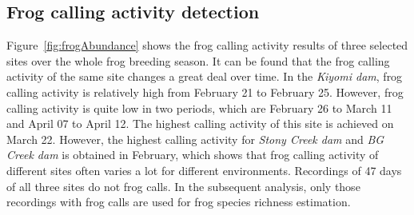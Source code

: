 \subsection{Frog calling activity detection}
Figure~\ref{fig:frogAbundance} shows the frog calling activity results of three selected sites over the whole frog breeding season. It can be found that the frog calling activity of the same site changes a great deal over time. In the \textit{Kiyomi dam}, frog calling activity is relatively high from February 21 to February 25. However, frog calling activity is quite low in two periods, which are February 26 to March 11 and April 07 to April 12. The highest calling activity of this site is achieved on March 22. However, the highest calling activity for \textit{Stony Creek dam} and \textit{BG Creek dam} is obtained in February, which shows that frog calling activity of different sites often varies a lot for different environments. Recordings of 47 days of all three sites do not frog calls. In the subsequent analysis, only those recordings with frog calls are used for frog species richness estimation. 

